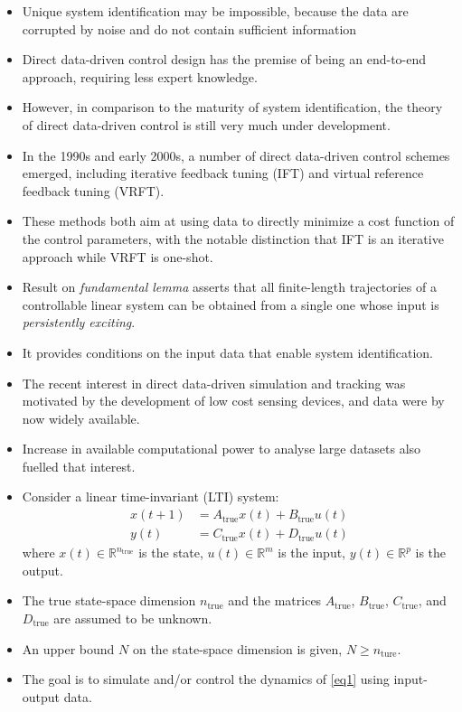\documentclass[hyperref={pdfpagemode=FullScreen},aspectratio=169]{beamer}
\begin{document}
\begin{frame}{}
\begin{itemize}
\setlength\itemsep{1em}
\item Unique system identification may be impossible, because the data are corrupted by noise and do not contain sufficient information
\item Direct data-driven control design has the premise of being an end-to-end approach, requiring less expert knowledge.
\item However, in comparison to the maturity of system identification, the theory of direct data-driven control is still very much under development.
\item  In the 1990s and early 2000s, a number of direct data-driven control schemes emerged, including iterative feedback tuning (IFT) and virtual reference feedback tuning (VRFT).
\item These methods both aim at using data to directly minimize a cost function of the control parameters, with the notable distinction that IFT is an iterative approach while VRFT is one-shot.
\item Result on \textit{fundamental lemma} asserts that all finite-length trajectories of a controllable linear system can be obtained from a single one whose input is \textit{persistently exciting}.
\item It provides conditions on the input data that enable system identification.
\end{itemize}
\end{frame}
\begin{frame}{}
\begin{itemize}
\setlength\itemsep{1em}
\item The recent interest in direct data-driven simulation and tracking was motivated by the development of low cost sensing devices, and data were by now widely available.
\item Increase in available computational power to analyse large datasets also fuelled that interest.
\item Consider a linear time-invariant (LTI) system:
\begin{subequations}\label{eq1}
\begin{align}
x(t+1) &= A_\text{true}x(t) + B_\text{true}u(t)\\
y(t) &= C_\text{true}x(t) + D_\text{true}u(t)
\end{align}
\end{subequations}
where $x(t)\in \mathbb{R}^{n_\text{true}}$ is the state, $u(t)\in \mathbb{R}^m$ is the input, $y(t)\in \mathbb{R}^p$ is the output.
\item The true state-space dimension $n_\text{true}$ and the matrices $A_\text{true}$, $B_\text{true}$, $C_\text{true}$, and $D_\text{true}$ are assumed to be unknown.
\item An upper bound $N$ on the state-space dimension is given, $N\geq n_\text{ture}$.
\item The goal is to simulate and/or control the dynamics of \cref{eq1} using input-output data.
\end{itemize}
\end{frame}
\end{document}
